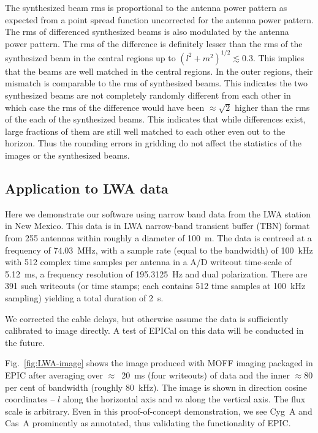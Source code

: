 \documentclass[a4paper,fleqn,usenatbib]{mnras}
\begin{document}
The synthesized beam rms is proportional to the antenna power pattern as 
expected from a point spread function uncorrected for the antenna power pattern. 
The rms of differenced synthesized beams is also modulated by the antenna power 
pattern. The rms of the difference is definitely lesser than the rms of the 
synthesized beam in the central regions up to $(l^2+m^2)^{1/2}\lesssim 0.3$. This 
implies that the beams are well matched in the central regions. In the outer 
regions, their mismatch is comparable to the rms of synthesized beams. This 
indicates the two synthesized beams are not completely randomly different from 
each other in which case the rms of the difference would have been 
$\approx \sqrt{2}$ higher than the rms of the each of the synthesized beams. 
This indicates that while differences exist, large fractions of them are still 
well matched to each other even out to the horizon. Thus the rounding errors in 
gridding do not affect the statistics of the images or the synthesized beams.

\subsection{Application to LWA data}\label{sec:LWA-data}

Here we demonstrate our software using narrow band data from the LWA station 
in New Mexico. This data is in LWA narrow-band transient buffer (TBN) format 
from 255 antennas within roughly a diameter of 100~m. The data is centreed at a 
frequency of 74.03~MHz, with a sample rate (equal to the bandwidth) of 100~kHz 
with 512 complex time samples per antenna in a A/D writeout time-scale of 
5.12~ms, a frequency resolution of 195.3125~Hz and dual polarization. There are 
391 such writeouts (or time stamps; each contains 512 time samples at 100~kHz 
sampling) yielding a total duration of 2~s. 

We corrected the cable delays, but otherwise assume the data is sufficiently 
calibrated to image directly. A test of EPICal on this data will be conducted 
in the future.

Fig.~\ref{fig:LWA-image} shows the image produced with MOFF imaging 
packaged in EPIC after averaging over $\approx$~20~ms (four writeouts) of data 
and the inner $\approx 80$ per cent of bandwidth (roughly 80~kHz). The image is 
shown in direction cosine coordinates -- $l$ along the horizontal axis and $m$ 
along the vertical axis. The flux scale is arbitrary. Even in this 
proof-of-concept demonstration, we see Cyg~A and Cas~A prominently as annotated, 
thus validating the functionality of EPIC.
\end{document}
